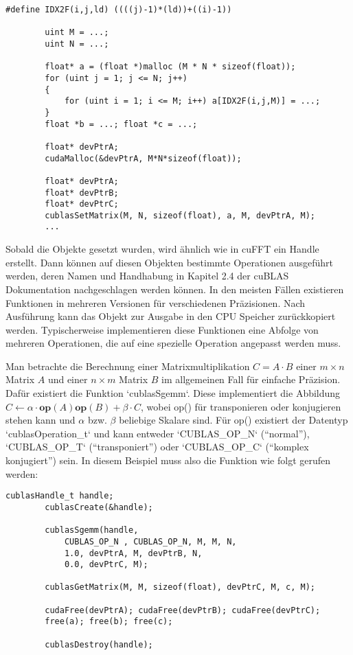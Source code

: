 		\begin{lstlisting}[caption=cuBLAS: Matrix setzen]
		#define IDX2F(i,j,ld) ((((j)-1)*(ld))+((i)-1))
		
		uint M = ...;
		uint N = ...;	

		float* a = (float *)malloc (M * N * sizeof(float));
		for (uint j = 1; j <= N; j++) 
		{
			for (uint i = 1; i <= M; i++) a[IDX2F(i,j,M)] = ...;
		}
		float *b = ...; float *c = ...;

		float* devPtrA;
		cudaMalloc(&devPtrA, M*N*sizeof(float));

		float* devPtrA;
		float* devPtrB;
		float* devPtrC;
		cublasSetMatrix(M, N, sizeof(float), a, M, devPtrA, M);
		...
		\end{lstlisting}
		
		Sobald die Objekte gesetzt wurden, wird ähnlich wie in cuFFT ein \Gls{Handle} erstellt. Dann können auf diesen Objekten bestimmte Operationen ausgeführt werden, deren Namen und Handhabung in Kapitel 2.4 der cuBLAS Dokumentation \autocite{cublasDoc} nachgeschlagen werden können. In den meisten Fällen existieren Funktionen in mehreren Versionen für verschiedenen Präzisionen. Nach Ausführung kann das Objekt zur Ausgabe in den CPU Speicher zurückkopiert werden. Typischerweise implementieren diese Funktionen eine Abfolge von mehreren Operationen, die auf eine spezielle Operation angepasst werden muss.
		
		Man betrachte die Berechnung einer Matrixmultiplikation $C = A\cdot B$ einer $m\times n$ Matrix $A$ und einer $n\times m$ Matrix $B$ im allgemeinen Fall für einfache Präzision. Dafür existiert die Funktion \li`cublasSgemm`. Diese implementiert die Abbildung $C \leftarrow \alpha\cdot\textbf{op}(A)\textbf{op}(B) + \beta\cdot C$, wobei op() für transponieren oder konjugieren stehen kann und $\alpha$ bzw. $\beta$ beliebige Skalare sind. Für op() existiert der Datentyp \li`cublasOperation_t` und kann entweder \li`CUBLAS_OP_N` (\enquote{normal}), \li`CUBLAS_OP_T` (\enquote{transponiert}) oder \li`CUBLAS_OP_C` (\enquote{komplex konjugiert}) sein. In diesem Beispiel muss also die Funktion wie folgt gerufen werden: 
		
		\begin{lstlisting}[caption=cuBLAS: Funktionsaufruf]
		cublasHandle_t handle;
		cublasCreate(&handle);
		
		cublasSgemm(handle, 
			CUBLAS_OP_N , CUBLAS_OP_N, M, M, N, 
			1.0, devPtrA, M, devPtrB, N, 
			0.0, devPtrC, M);
		
		cublasGetMatrix(M, M, sizeof(float), devPtrC, M, c, M);
		
		cudaFree(devPtrA); cudaFree(devPtrB); cudaFree(devPtrC);			
		free(a); free(b); free(c);
		
		cublasDestroy(handle);
		\end{lstlisting}
		
